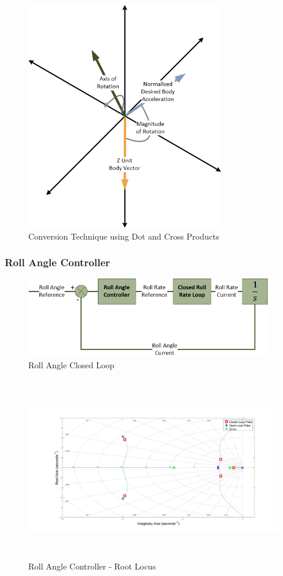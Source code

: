 \documentclass[12pt]{report}
\begin{document}
\begin{figure}[H]
	\centering
	\includegraphics[height = 10cm]{../References/Diagrams/ConversionMethod.jpg}
	\caption{Conversion Technique using Dot and Cross Products}
	\label{IM_AngleMethod}
\end{figure}

\subsubsection{Roll Angle Controller}

\begin{figure}[H]
	\centering
	\includegraphics[height = 3.5cm]{../References/Diagrams/RollAngleLoop.jpg}
	\caption{Roll Angle Closed Loop}
	\label{IM_RollAngleLoop}
\end{figure}

\begin{figure}[H]
	\centering
	\includegraphics[height = 8cm]{../Design/Matlab/Controllers/roll_angle_root.jpg}
	\caption{Roll Angle Controller -  Root Locus}
	\label{IM_RollAngleControlRoot}
\end{figure}
\end{document}
